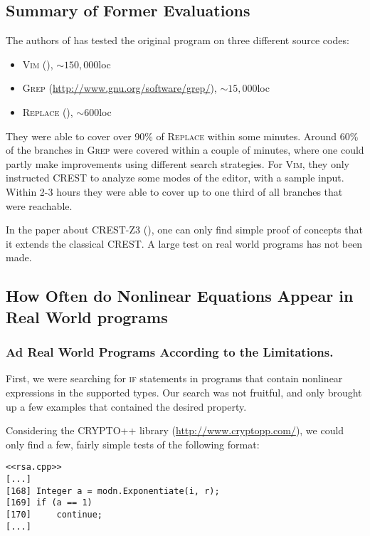 \documentclass[oribibl]{llncs}
\begin{document}
\subsection{Summary of Former Evaluations}

The authors of \cite{CREST} has tested the original program on three
different source codes:

\begin{itemize}
  \item \textsc{Vim} (\cite{oualline2001vi}), $\sim 150,000$loc
  \item \textsc{Grep} (\url{http://www.gnu.org/software/grep/}), $\sim
    15,000$loc
  \item \textsc{Replace} (\cite{harrold2010siemens}), $\sim 600$loc
\end{itemize}

They were able to cover over 90\% of \textsc{Replace} within some
minutes. Around 60\% of the branches in \textsc{Grep} were covered
within a couple of minutes, where one could partly make improvements
using different search strategies. For \textsc{Vim}, they only instructed \textsc{CREST} to analyze some modes of the editor, with a
sample input. Within 2-3 hours they were able to cover up to one third
of all branches that were reachable.

In the paper about \textsc{CREST-Z3} (\cite{CRESTZ3}), one can only
find simple proof of concepts that it extends the classical
\textsc{CREST}. A large test on real world programs has not been made.

\subsection{How Often do Nonlinear Equations Appear in Real World
  programs}

\subsubsection{Ad Real World Programs According to the Limitations.}
First, we were searching for \textsc{if} statements in programs that
contain nonlinear expressions in the supported types. Our search was
not fruitful, and only brought up a few examples that contained the
desired property.

Considering the \textsc{CRYPTO++} library
(\url{http://www.cryptopp.com/}), we could only find a few, fairly
simple tests of the following format:

\begin{verbatim}
<<rsa.cpp>>
[...]
[168] Integer a = modn.Exponentiate(i, r);
[169] if (a == 1)
[170]     continue;
[...]
\end{verbatim}
\end{document}
